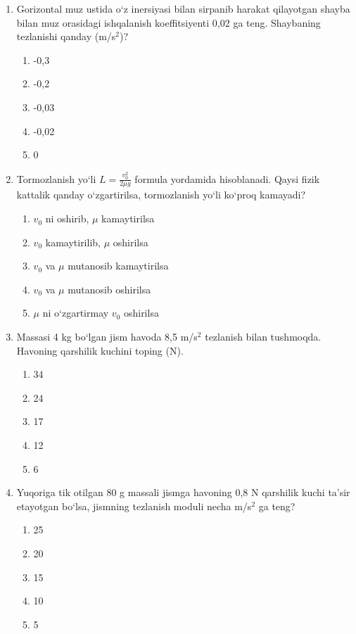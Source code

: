 \begin{enumerate}
\item Gorizontal muz ustida o‘z inersiyasi bilan sirpanib
harakat qilayotgan shayba bilan muz orasidagi
ishqalanish koeffitsiyenti 0,02 ga teng.
Shaybaning tezlanishi qanday (m/s$^2$)?

\begin{enumerate}[label=\Alph*)]
\item -0,3
\item -0,2
\item -0,03
\item -0,02
\item 0
\end{enumerate}


\item Tormozlanish yo‘li $L=\frac{v_0^2}{2\mu g}$ formula yordamida hisoblanadi. Qaysi fizik kattalik qanday o‘zgartirilsa, tormozlanish yo‘li ko‘proq kamayadi?

\begin{enumerate}[label=\Alph*)]
\item $v_0$ ni oshirib, $\mu$ kamaytirilsa
\item $v_0$ kamaytirilib, $\mu$ oshirilsa
\item $v_0$ va $\mu$ mutanosib kamaytirilsa
\item $v_0$ va $\mu$ mutanosib oshirilsa
\item $\mu$ ni o‘zgartirmay $v_0$ oshirilsa
\end{enumerate}


\item Massasi 4 kg bo‘lgan jism havoda 8,5 m/s$^2$ tezlanish bilan tushmoqda. Havoning qarshilik kuchini toping (N).

\begin{enumerate}[label=\Alph*)]
\item 34
\item 24
\item 17
\item 12
\item 6
\end{enumerate}


\item Yuqoriga tik otilgan 80 g massali jismga havoning 0,8 N qarshilik kuchi ta’sir etayotgan bo‘lsa, jismning tezlanish moduli necha m/s$^2$ ga teng?

\begin{enumerate}[label=\Alph*)]
\item 25
\item 20
\item 15
\item 10
\item 5
\end{enumerate}



\end{enumerate}
